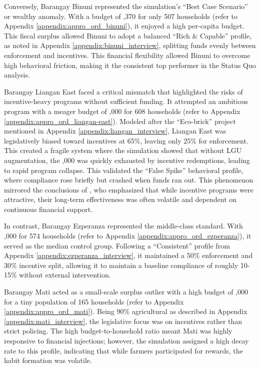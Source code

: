 Conversely, Barangay Binuni represented the simulation’s ``Best Case Scenario'' or wealthy anomaly. With a budget of ,370 for only 507 households (refer to Appendix \ref{appendix:appro_ord_binuni}), it enjoyed a high per-capita budget. This fiscal surplus allowed Binuni to adopt a balanced ``Rich \& Capable'' profile, as noted in Appendix \ref{appendix:binuni_interview}, splitting funds evenly between enforcement and incentives. This financial flexibility allowed Binuni to overcome high behavioral friction, making it the consistent top performer in the Status Quo analysis.

Barangay Liangan East faced a critical mismatch that highlighted the risks of incentive-heavy programs without sufficient funding. It attempted an ambitious program with a meager budget of ,000 for 608 households (refer to Appendix \ref{appendix:appro_ord_liangan-east}). Modeled after the ``Eco-brick'' project mentioned in Appendix \ref{appendix:liangan_interview}, Liangan East was legislatively biased toward incentives at 65\%, leaving only 25\% for enforcement. This created a fragile system where the simulation showed that without LGU augmentation, the ,000 was quickly exhausted by incentive redemptions, leading to rapid program collapse. This validated the ``False Spike'' behavioral profile, where compliance rose briefly but crashed when funds ran out. This phenomenon mirrored the conclusions of \cite{Camarillo2021}, who emphasized that while incentive programs were attractive, their long-term effectiveness was often volatile and dependent on continuous financial support.

In contrast, Barangay Ezperanza represented the middle-class standard. With ,000 for 574 households (refer to Appendix \ref{appendix:appro_ord_ezperanza}), it served as the median control group. Following a ``Consistent'' profile from Appendix \ref{appendix:ezperanza_interview}, it maintained a 50\% enforcement and 30\% incentive split, allowing it to maintain a baseline compliance of roughly 10-15\% without external intervention.

Barangay Mati acted as a small-scale surplus outlier with a high budget of ,000 for a tiny population of 165 households (refer to Appendix \ref{appendix:appro_ord_mati}). Being 90\% agricultural as described in Appendix \ref{appendix:mati_interview}, the legislative focus was on incentives rather than strict policing. The high budget-to-household ratio meant Mati was highly responsive to financial injections; however, the simulation assigned a high decay rate to this profile, indicating that while farmers participated for rewards, the habit formation was volatile.

